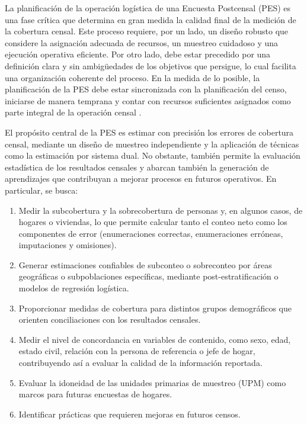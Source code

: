 \documentclass[
  12pt,
]{book}
\begin{document}
La planificación de la operación logística de una Encuesta Postcensal (PES) es una fase crítica que determina en gran medida la calidad final de la medición de la cobertura censal. Este proceso requiere, por un lado, un diseño robusto que considere la asignación adecuada de recursos, un muestreo cuidadoso y una ejecución operativa eficiente. Por otro lado, debe estar precedido por una definición clara y sin ambigüedades de los objetivos que persigue, lo cual facilita una organización coherente del proceso. En la medida de lo posible, la planificación de la PES debe estar sincronizada con la planificación del censo, iniciarse de manera temprana y contar con recursos suficientes asignados como parte integral de la operación censal \citep{UnitedNations_2010, hogan2003}.

El propósito central de la PES es estimar con precisión los errores de cobertura censal, mediante un diseño de muestreo independiente y la aplicación de técnicas como la estimación por sistema dual. No obstante, también permite la evaluación estadística de los resultados censales y abarcan también la generación de aprendizajes que contribuyan a mejorar procesos en futuros operativos. En particular, se busca:

\begin{enumerate}
\def\labelenumi{\arabic{enumi}.}
\item
  Medir la subcobertura y la sobrecobertura de personas y, en algunos casos, de hogares o viviendas, lo que permite calcular tanto el conteo neto como los componentes de error (enumeraciones correctas, enumeraciones erróneas, imputaciones y omisiones).
\item
  Generar estimaciones confiables de subconteo o sobreconteo por áreas geográficas o subpoblaciones específicas, mediante post-estratificación o modelos de regresión logística.
\item
  Proporcionar medidas de cobertura para distintos grupos demográficos que orienten conciliaciones con los resultados censales.
\item
  Medir el nivel de concordancia en variables de contenido, como sexo, edad, estado civil, relación con la persona de referencia o jefe de hogar, contribuyendo así a evaluar la calidad de la información reportada.
\item
  Evaluar la idoneidad de las unidades primarias de muestreo (UPM) como marcos para futuras encuestas de hogares.
\item
  Identificar prácticas que requieren mejoras en futuros censos.
\end{enumerate}
\end{document}
